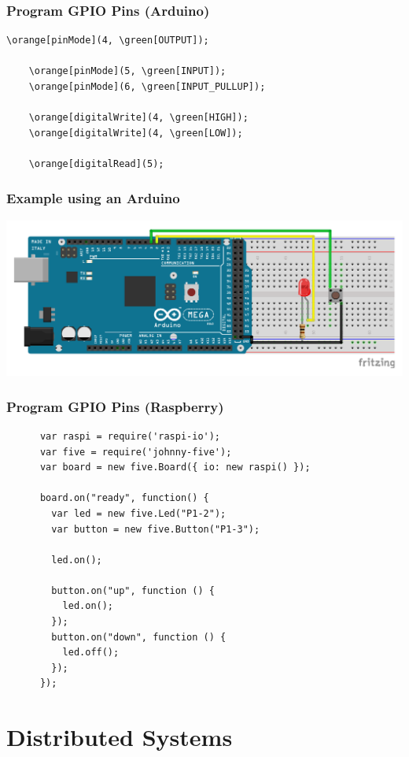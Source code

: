 \documentclass{beamer}
\newcommand{\orange}[1]{{\color{orangeiot} #1}}
\newcommand{\green}[1]{{\color{greeniot1} #1}}
\begin{document}
\begin{frame}[fragile]
  \frametitle{Program GPIO Pins (Arduino)}
  
  \begin{Verbatim}[commandchars=\\\[\]]
    \orange[pinMode](4, \green[OUTPUT]);
  
    \orange[pinMode](5, \green[INPUT]);
    \orange[pinMode](6, \green[INPUT_PULLUP]);
    
    \orange[digitalWrite](4, \green[HIGH]);
    \orange[digitalWrite](4, \green[LOW]);
    
    \orange[digitalRead](5);
  \end{Verbatim}
\end{frame}

\begin{frame}
  \frametitle{Example using an Arduino}
  
  \centering
  \includegraphics[width=\textwidth]{demo/circuit.pdf}
\end{frame}

\begin{frame}[fragile]
  \frametitle{Program GPIO Pins (Raspberry)}
  
  {
    \small
    \begin{verbatim}
      var raspi = require('raspi-io');
      var five = require('johnny-five');
      var board = new five.Board({ io: new raspi() });
      
      board.on("ready", function() {
        var led = new five.Led("P1-2");
        var button = new five.Button("P1-3");
        
        led.on();
        
        button.on("up", function () {
          led.on();
        });
        button.on("down", function () {
          led.off();
        });
      });
    \end{verbatim}
  }
\end{frame}

\section{Distributed Systems}
\end{document}
